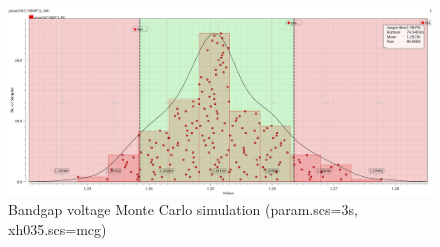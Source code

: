 \begin{figure}[ht]
	\centering
	\includegraphics[width=\textwidth]{images/05_bandgap/band_volt_mc.pdf}
	\caption{Bandgap voltage Monte Carlo simulation (param.scs=3s, xh035.scs=mcg)}
	\label{fig:bandgap_voltage_mc}
\end{figure}
\clearpage
